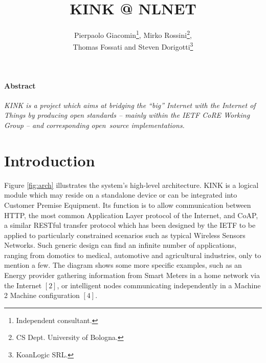 \documentclass[12pt]{article}
\title{KINK @ NLNET}
\author{Pierpaolo Giacomin\footnote{Independent consultant.}, Mirko Rossini\footnote{CS Dept. University of Bologna.},\\Thomas Fossati and Steven Dorigotti\footnote{KoanLogic SRL.}}
\begin{document}
\maketitle
\tableofcontents

\paragraph{Abstract}
\emph{KINK is a project which aims at bridging the ``big'' Internet with the Internet of Things by producing open standards -- mainly within the IETF CoRE Working Group -- and corresponding \mbox{open source} implementations.}\\

\section{Introduction}
\label{sec:intro}

Figure \ref{fig:arch} illustrates the system's high-level architecture. KINK is a logical module which may reside on a standalone device or can be integrated into Customer Premise Equipment. Its function is to allow communication between HTTP, the most common Application Layer protocol of the Internet, and CoAP, a similar RESTful transfer protocol which has been designed by the IETF to be applied to particularly constrained scenarios such as typical Wireless Sensors Networks. Such generic design can find an infinite number of applications, ranging from domotics to medical, automotive and agricultural industries, only to mention a few. The diagram shows some more specific examples, such as an Energy provider gathering information from Smart Meters in a home network via the Internet $[2]$, or intelligent nodes communicating independently in a Machine 2 Machine configuration $[4]$.
\end{document}
